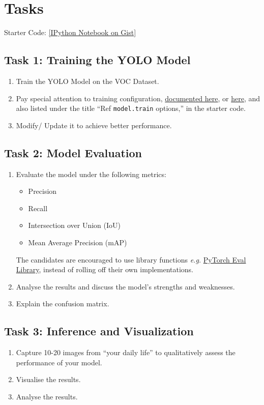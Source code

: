 \documentclass[11pt]{article}
\begin{document}
\section{Tasks}
\label{sec:org6d07aff}
Starter Code: \href{https://gist.github.com/bvraghav/325de78ce4a705f12e940c7e29a2b06e}{[IPython Notebook on Gist]​}

\subsection{Task 1: Training the YOLO Model}
\label{sec:orge31b7fc}
\begin{enumerate}
\item Train the YOLO Model on the VOC Dataset.
\item Pay special attention to training configuration,
\href{https://docs.ultralytics.com/modes/train/\#train-settings}{documented here}, or \href{https://github.com/ultralytics/ultralytics/blob/main/ultralytics/cfg/default.yaml}{here}, and also listed under the
title ``Ref \texttt{model.train} options,'' in the starter
code.
\item Modify/ Update it to achieve better performance.
\end{enumerate}

\subsection{Task 2: Model Evaluation}
\label{sec:orgf001a21}
\begin{enumerate}
\item Evaluate the model under the following metrics:
\begin{itemize}
\item Precision
\item Recall
\item Intersection over Union (IoU)
\item Mean Average Precision (mAP)
\end{itemize}
The candidates are encouraged to use library
functions \emph{e.g.} \href{https://pytorch.org/torcheval/stable/torcheval.metrics.html}{PyTorch Eval Library}, instead of
rolling off their own implementations.
\item Analyse the results and discuss the model's
strengths and weaknesses.
\item Explain the confusion matrix.
\end{enumerate}
\subsection{Task 3: Inference and Visualization}
\label{sec:org2a7c6af}
\begin{enumerate}
\item Capture 10-20 images from ``your daily life'' to
qualitatively assess the performance of your model.
\item Visualise the results.
\item Analyse the results.
\end{enumerate}
\end{document}
